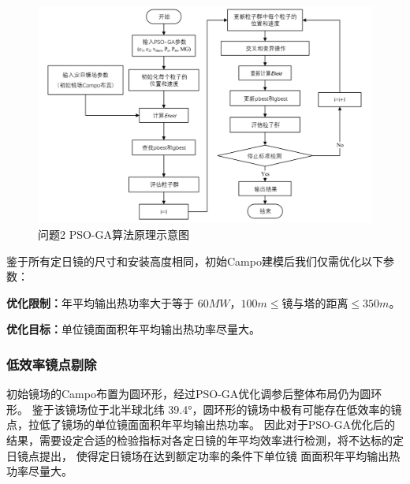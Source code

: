 \documentclass{article}
\numberwithin{equation}{subsection}
\begin{document}
\begin{figure}[H]
    \centering
    \includegraphics[scale=0.5]{问题2-1PSO-GA算法原理示意图.png}
    \caption{问题2 PSO-GA算法原理示意图}
\end{figure}

鉴于所有定日镜的尺寸和安装高度相同，初始Campo建模后我们仅需优化以下参数： 
\begin{table}[H]
    \centering
    \caption{问题2模型优化参数列表}
\end{table}

\textbf{优化限制：}年平均输出热功率大于等于 $ 60 MW$，$100m\leq$镜与塔的距离$\leq 350m$。

\textbf{优化目标：}单位镜面面积年平均输出热功率尽量大。

\subsubsection{低效率镜点剔除}
初始镜场的Campo布置为圆环形，经过PSO-GA优化调参后整体布局仍为圆环形。
鉴于该镜场位于北半球北纬 39.4°，圆环形的镜场中极有可能存在低效率的镜点，拉低了镜场的单位镜面面积年平均输出热功率。
因此对于PSO-GA优化后的结果，需要设定合适的检验指标对各定日镜的年平均效率进行检测，将不达标的定日镜点提出，
使得定日镜场在达到额定功率的条件下单位镜
面面积年平均输出热功率尽量大。
\end{document}
